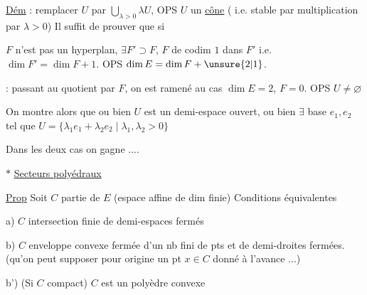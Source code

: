 
 \uline{Dém}  : remplacer $U$ par $\bigcup_{\lambda>0}\lambda U$, OPS $U$ un \uline{cône} ( i.e. stable par multiplication par $\lambda>0$) Il suffit de prouver que si

$F$ n'est pas un hyperplan, $\exists F'\supset F$, $F$ de codim $1$ dans $F'$ i.e. $\dim F'=\dim F+1$. OPS $\dim E=\dim F+\unsure{2|1}$.

 : passant au quotient par $F$, on est ramené au cas $\dim E=2$, $F=0$. OPS $U\ne\varnothing$

On montre alors que ou bien $U$ est un demi-espace ouvert, ou bien $\exists$ base $e_1,e_2$ tel que $U=\{\lambda_1 e_1+\lambda_2 e_2\mid\lambda_1,\lambda_2>0\}$


Dans les deux cas on gagne ....


$\ast$ \uline{Secteurs polyédraux}

\uline{Prop} Soit $C$ partie de $E$ (espace affine de dim finie) Conditions équivalentes

a) $C$ intersection finie de demi-espaces fermés

b) $C$ enveloppe convexe fermée d'un nb fini de pts et de demi-droites fermées. (qu'on peut supposer  pour origine un pt $x\in C$ donné à l'avance ...)

b') (Si $C$ compact) $C$ est un polyèdre convexe
